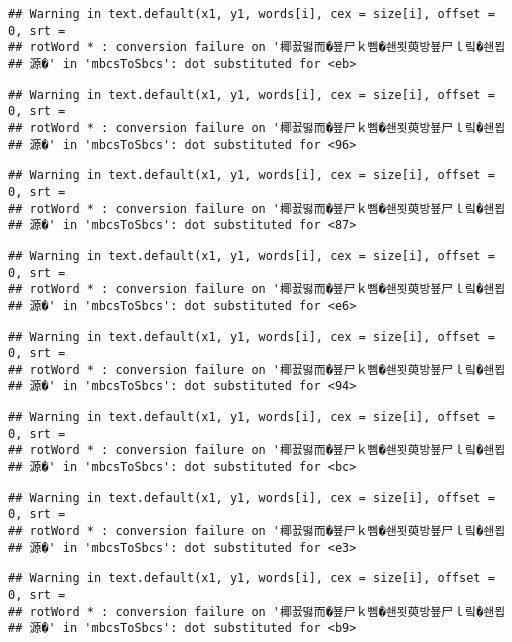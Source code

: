 \documentclass[]{article}
\begin{document}
\begin{verbatim}
## Warning in text.default(x1, y1, words[i], cex = size[i], offset = 0, srt =
## rotWord * : conversion failure on '椰꾨떯而�뵾尸ｋ뻼�쇈묏萸방뵾尸ｌ맄�쇈묍
## 源�' in 'mbcsToSbcs': dot substituted for <eb>
\end{verbatim}

\begin{verbatim}
## Warning in text.default(x1, y1, words[i], cex = size[i], offset = 0, srt =
## rotWord * : conversion failure on '椰꾨떯而�뵾尸ｋ뻼�쇈묏萸방뵾尸ｌ맄�쇈묍
## 源�' in 'mbcsToSbcs': dot substituted for <96>
\end{verbatim}

\begin{verbatim}
## Warning in text.default(x1, y1, words[i], cex = size[i], offset = 0, srt =
## rotWord * : conversion failure on '椰꾨떯而�뵾尸ｋ뻼�쇈묏萸방뵾尸ｌ맄�쇈묍
## 源�' in 'mbcsToSbcs': dot substituted for <87>
\end{verbatim}

\begin{verbatim}
## Warning in text.default(x1, y1, words[i], cex = size[i], offset = 0, srt =
## rotWord * : conversion failure on '椰꾨떯而�뵾尸ｋ뻼�쇈묏萸방뵾尸ｌ맄�쇈묍
## 源�' in 'mbcsToSbcs': dot substituted for <e6>
\end{verbatim}

\begin{verbatim}
## Warning in text.default(x1, y1, words[i], cex = size[i], offset = 0, srt =
## rotWord * : conversion failure on '椰꾨떯而�뵾尸ｋ뻼�쇈묏萸방뵾尸ｌ맄�쇈묍
## 源�' in 'mbcsToSbcs': dot substituted for <94>
\end{verbatim}

\begin{verbatim}
## Warning in text.default(x1, y1, words[i], cex = size[i], offset = 0, srt =
## rotWord * : conversion failure on '椰꾨떯而�뵾尸ｋ뻼�쇈묏萸방뵾尸ｌ맄�쇈묍
## 源�' in 'mbcsToSbcs': dot substituted for <bc>
\end{verbatim}

\begin{verbatim}
## Warning in text.default(x1, y1, words[i], cex = size[i], offset = 0, srt =
## rotWord * : conversion failure on '椰꾨떯而�뵾尸ｋ뻼�쇈묏萸방뵾尸ｌ맄�쇈묍
## 源�' in 'mbcsToSbcs': dot substituted for <e3>
\end{verbatim}

\begin{verbatim}
## Warning in text.default(x1, y1, words[i], cex = size[i], offset = 0, srt =
## rotWord * : conversion failure on '椰꾨떯而�뵾尸ｋ뻼�쇈묏萸방뵾尸ｌ맄�쇈묍
## 源�' in 'mbcsToSbcs': dot substituted for <b9>
\end{verbatim}
\end{document}
